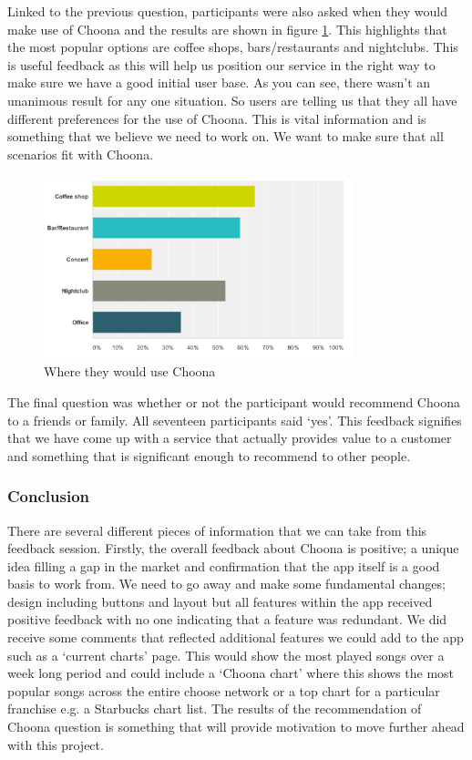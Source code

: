 Linked to the previous question, participants were also asked when they would make use of Choona and the results are shown in figure \ref{fig:where}.  This highlights that the most popular options are coffee shops, bars/restaurants and nightclubs.  This is useful feedback as this will help us position our service in the right way to make sure we have a good initial user base.  As you can see, there wasn't an unanimous result for any one situation.  So users are telling us that they all have different preferences for the use of Choona.  This is vital information and is something that we believe we need to work on.  We want to make sure that all scenarios fit with Choona.  \\

    \begin{figure}[h!]
      \centering
      \includegraphics[width=0.8\textwidth]{./img/use_situation.png}
      \caption{Where they would use Choona}
      \label{fig:where}
    \end{figure}

The final question was whether or not the participant would recommend Choona to a friends or family.  All seventeen participants said `yes'.  This feedback signifies that we have come up with a service that actually provides value to a customer and something that is significant enough to recommend to other people.  

\subsubsection{Conclusion}
There are several different pieces of information that we can take from this feedback session.  Firstly, the overall feedback about Choona is positive; a unique idea filling a gap in the market and confirmation that the app itself is a good basis to work from.  We need to go away and make some fundamental changes; design including buttons and layout but all features within the app received positive feedback with no one indicating that a feature was redundant.  We did receive some comments that reflected additional features we could add to the app such as a `current charts' page.  This would show the most played songs over a week long period and could include a `Choona chart' where this shows the most popular songs across the entire choose network or a top chart for a particular franchise e.g. a Starbucks chart list.  The results of the recommendation of Choona question is something that will provide motivation to move further ahead with this project.


